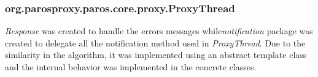 \subsubsection{org.parosproxy.paros.core.proxy.ProxyThread}

\textit{Response} was created to handle the errors messages while\textit{notification} package was created to delegate all the notification method used in \textit{ProxyThread}. Due to the similarity in the algorithm, it was implemented using an abstract template class and the internal behavior was implemented in the concrete classes.
